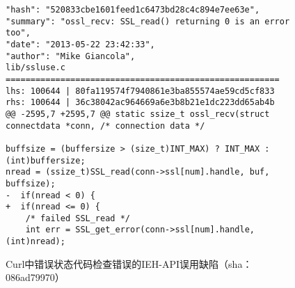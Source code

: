 \begin{figure}[b]
	\centering
\begin{lstlisting}
"hash": "520833cbe1601feed1c6473bd28c4c894e7ee63e",
"summary": "ossl_recv: SSL_read() returning 0 is an error too",
"date": "2013-05-22 23:42:33",
"author": "Mike Giancola",
lib/ssluse.c
=======================================================
lhs: 100644 | 80fa119574f7940861e3ba855574ae59cd5cf833
rhs: 100644 | 36c38042ac964669a6e3b8b21e1dc223dd65ab4b
@@ -2595,7 +2595,7 @@ static ssize_t ossl_recv(struct connectdata *conn, /* connection data */

buffsize = (buffersize > (size_t)INT_MAX) ? INT_MAX : (int)buffersize;
nread = (ssize_t)SSL_read(conn->ssl[num].handle, buf, buffsize);
-  if(nread < 0) {
+  if(nread <= 0) {
	/* failed SSL_read */
	int err = SSL_get_error(conn->ssl[num].handle, (int)nread);

\end{lstlisting}
	\caption{
	Curl中错误状态代码检查错误的IEH-API误用缺陷（sha：086ad79970）
	}
	\label{fig:2-3-ieh-2}
\end{figure}